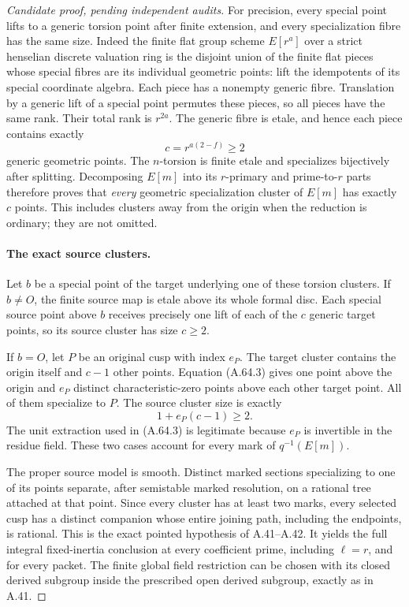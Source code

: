 \begin{proof}[Candidate proof, pending independent audits]
For precision, every special point lifts to a
generic torsion point after finite extension,
and every specialization fibre has the same size.
Indeed the finite flat group scheme \(E[r^a]\)
over a strict henselian discrete valuation ring
is the disjoint union of the finite flat pieces
whose special fibres are its individual geometric
points: lift the idempotents of its special
coordinate algebra. Each piece has a nonempty
generic fibre. Translation by a generic lift of
a special point permutes these pieces, so all
pieces have the same rank. Their total rank is
\(r^{2a}\). The generic fibre is etale, and hence
each piece contains exactly
\[
                             c=r^{a(2-f)}\ge2           \tag{A.64.4}
\]
generic geometric points. The \(n\)-torsion is
finite etale and specializes bijectively after
splitting. Decomposing \(E[m]\) into its
\(r\)-primary and prime-to-\(r\) parts therefore
proves that \emph{every} geometric specialization
cluster of \(E[m]\) has exactly \(c\) points.
This includes clusters away from the origin when
the reduction is ordinary; they are not omitted.

\paragraph{The exact source clusters.}
Let \(b\) be a special point of the target
underlying one of these torsion clusters.
If \(b\ne O\), the finite source map is etale
above its whole formal disc. Each special source
point above \(b\) receives precisely one lift
of each of the \(c\) generic target points,
so its source cluster has size \(c\ge2\).

If \(b=O\), let \(P\) be an original cusp
with index \(e_P\). The target cluster contains
the origin itself and \(c-1\) other points.
Equation (A.64.3) gives one point above the
origin and \(e_P\) distinct characteristic-zero
points above each other target point. All of
them specialize to \(P\). The source cluster
size is exactly
\[
                              1+e_P(c-1)\ge2.          \tag{A.64.5}
\]
The unit extraction used in (A.64.3) is legitimate
because \(e_P\) is invertible in the residue
field. These two cases account for every mark
of \(q^{-1}(E[m])\).

The proper source model is smooth. Distinct
marked sections specializing to one of its
points separate, after semistable marked
resolution, on a rational tree attached at
that point. Since every cluster has at least
two marks, every selected cusp has a distinct
companion whose entire joining path, including
the endpoints, is rational. This is the exact
pointed hypothesis of A.41--A.42. It yields the
full integral fixed-inertia conclusion at
every coefficient prime, including \(\ell=r\),
and for every packet. The finite global field
restriction can be chosen with its closed
derived subgroup inside the prescribed open
derived subgroup, exactly as in A.41.


\end{proof}
